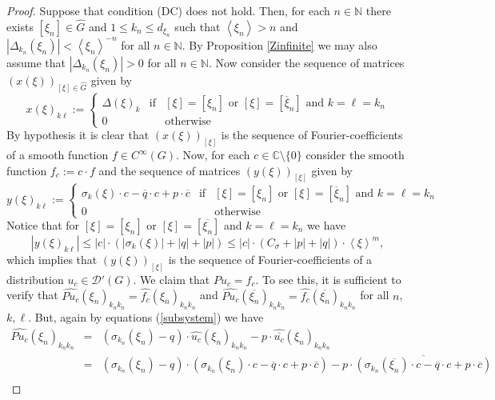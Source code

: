 \documentclass[sn-mathphys-num]{sn-jnl}%
\numberwithin{equation}{section}
\theoremstyle{thmstyleone}
\theoremstyle{thmstyletwo}
\theoremstyle{thmstylethree}
\def\jp#1{{\left\langle{#1}\right\rangle}}
\begin{document}
\begin{proof} Suppose that condition (DC) does not hold. Then, for each $n \in \mathbb{N}$ there exists $[\xi_n] \in \widehat{G}$ and $1 \leq k_n \leq d_{\xi_n}$ such that $\jp{\xi_n}>n$ and $|\Delta_{k_n}(\xi_n)|<\jp{\xi_n}^{-n}$ for all $n \in \mathbb{N}$. By Proposition \ref{Zinfinite} we may also assume that $|\Delta_{k_n}(\xi_n)|>0$ for all $n \in \mathbb{N}$. Now consider the sequence of matrices $(x(\xi))_{[\xi] \in \widehat{G}}$ given by
	$$x(\xi)_{k\ell}:= \left\{ \begin{array}{ccc} \Delta(\xi)_{k} & \textrm{if} & [\xi]=[\xi_n] \textrm{ or } [\xi]=[\overline{\xi}_n] \textrm{ and } k=\ell=k_n\\ 0 & & \textrm{otherwise}   \end{array}  \right.$$
By hypothesis it is clear that $(x(\xi))_{[\xi]}$ is the sequence of Fourier-coefficients of a smooth function $f \in C^\infty(G)$. Now, for each $c \in \mathbb{C}\setminus \{0\}$ consider the smooth function $f_c:=c \cdot f$ and the sequence of matrices $(y(\xi))_{[\xi]}$ given by
$$y(\xi)_{k\ell}:= \left\{ \begin{array}{ccc} \sigma_{k}(\xi)\cdot c-\overline{q}\cdot c+p\cdot \overline{c} & \textrm{if} & [\xi]=[\xi_n] \textrm{ or } [\xi]=[\overline{\xi}_n] \textrm{ and } k=\ell=k_n\\ 0 & & \textrm{otherwise}   \end{array}  \right.$$
Notice that for $[\xi]=[\xi_n]$ or $[\xi]=[\overline{\xi_n}]$ and $k=\ell=k_n$ we have
$$|y(\xi)_{k \ell}| \leq |c| \cdot(|\sigma_k(\xi)|+|q|+|p|) \leq |c| \cdot (C_\sigma +|p|+|q|)\cdot \jp{\xi}^m,$$
which implies that $(y(\xi))_{[\xi]}$ is the sequence of Fourier-coefficients of a distribution $u_c \in \mathcal{D}'(G)$. We claim that $Pu_c=f_c$. To see this, it is sufficient to verify that $\widehat{Pu_c}(\xi_n)_{k_n k_n}=\widehat{f_c}(\xi_n)_{k_n k_n}$ and $\widehat{Pu_c}(\overline{\xi_n})_{k_n k_n}=\widehat{f_c}(\overline{\xi_n})_{k_n k_n}$  for all $n$, $k,\ell$. But, again by equations (\ref{subsystem}) we have
\begin{eqnarray*}
	\widehat{Pu_c}(\xi_n)_{k_n k_n} & = & (\sigma_{k_n}(\xi_n)-q) \cdot \widehat{u_c}(\xi_n)_{k_n k_n}-p\cdot \widehat{\overline{u_c}}(\xi_n)_{k_n k_n} \\
	& = & (\sigma_{k_n}(\xi_n)-q) \cdot (\sigma_{k_n}(\xi_n)\cdot c-\overline{q}\cdot c +p\cdot \overline{c})- p \cdot \overline{(\sigma_{k_n}(\overline{\xi_n})\cdot c-\overline{q}\cdot c+p\cdot \overline{c})} \\

\end{eqnarray*}
\end{proof}
\end{document}
